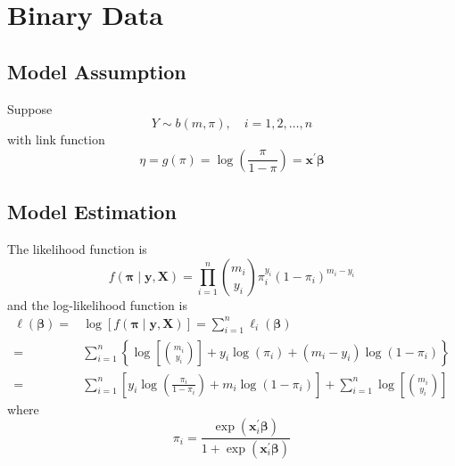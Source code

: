 \chapter{Binary Data}

\section{Model Assumption}

Suppose
\begin{equation}
    Y\sim b\left(m,\pi\right),\quad i=1,2,\ldots,n
\end{equation}
with link function
\begin{equation}
    \eta=g\left(\pi\right)=\log\left(\frac{\pi}{1-\pi}\right)=\mathbf{x}^{\prime}\boldsymbol{\beta}
\end{equation}

\section{Model Estimation}

The likelihood function is
\begin{equation}
    f\left(\boldsymbol{\pi}\mid\mathbf{y},\mathbf{X}\right)=\prod_{i=1}^{n}\binom{m_{i}}{y_{i}}\pi_{i}^{y_{i}}\left(1-\pi_{i}\right)^{m_{i}-y_{i}}
\end{equation}
and the log-likelihood function is
\begin{equation}
    \begin{aligned}
        \ell\left(\boldsymbol{\beta}\right)= & \log\left[f\left(\boldsymbol{\pi}\mid\mathbf{y},\mathbf{X}\right)\right]=\sum_{i=1}^{n}\ell_{i}\left(\boldsymbol{\beta}\right)                                 \\
        =                                    & \sum_{i=1}^{n}\left\{\log\left[\binom{m_{i}}{y_{i}}\right]+y_{i}\log\left(\pi_{i}\right)+\left(m_{i}-y_{i}\right)\log\left(1-\pi_{i}\right)\right\}            \\
        =                                    & \sum_{i=1}^{n}\left[y_{i}\log\left(\frac{\pi_{i}}{1-\pi_{i}}\right)+m_{i}\log\left(1-\pi_{i}\right)\right]+\sum_{i=1}^{n}\log\left[\binom{m_{i}}{y_{i}}\right]
    \end{aligned}
\end{equation}
where
\begin{equation}
    \pi_{i}=\frac{\exp\left(\mathbf{x}_{i}^{\prime}\boldsymbol{\beta}\right)}{1+\exp\left(\mathbf{x}_{i}^{\prime}\boldsymbol{\beta}\right)}
\end{equation}
